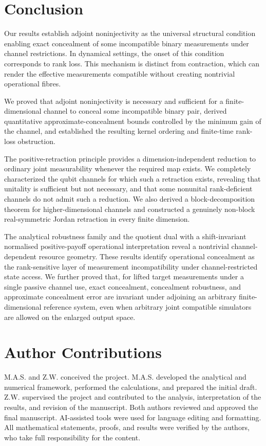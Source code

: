 \documentclass[
aps,pra,twocolumn,10pt,
superscriptaddress,longbibliography,floatfix
]{revtex4-2}
\begin{document}
\section{Conclusion}
\label{sec:conclusion}

Our results establish adjoint noninjectivity as the universal structural condition enabling exact concealment of some incompatible binary measurements under channel restrictions. In dynamical settings, the onset of this condition corresponds to rank loss. This mechanism is distinct from contraction, which can render the effective measurements compatible without creating nontrivial operational fibres.

We proved that adjoint noninjectivity is necessary and sufficient for a finite-dimensional channel to conceal some incompatible binary pair, derived quantitative approximate-concealment bounds controlled by the minimum gain of the channel, and established the resulting kernel ordering and finite-time rank-loss obstruction.

The positive-retraction principle provides a dimension-independent reduction to ordinary joint measurability whenever the required map exists. We completely characterized the qubit channels for which such a retraction exists, revealing that unitality is sufficient but not necessary, and that some nonunital rank-deficient channels do not admit such a reduction. We also derived a block-decomposition theorem for higher-dimensional channels and constructed a genuinely non-block real-symmetric Jordan retraction in every finite dimension.

The analytical robustness family and the quotient dual with a shift-invariant normalised positive-payoff operational interpretation reveal a nontrivial channel-dependent resource geometry. These results identify operational concealment as the rank-sensitive layer of measurement incompatibility under channel-restricted state access. We further proved that, for lifted target measurements under a single passive channel use, exact concealment, concealment robustness, and approximate concealment error are invariant under adjoining an arbitrary finite-dimensional reference system, even when arbitrary joint compatible simulators are allowed on the enlarged output space.

\section*{Author Contributions}
M.A.S. and Z.W. conceived the project. M.A.S. developed the analytical and numerical framework, performed the calculations, and prepared the initial draft. Z.W. supervised the project and contributed to the analysis, interpretation of the results, and revision of the manuscript. Both authors reviewed and approved the final manuscript. AI-assisted tools were used for language editing and formatting. All mathematical statements, proofs, and results were verified by the authors, who take full responsibility for the content.
\end{document}
